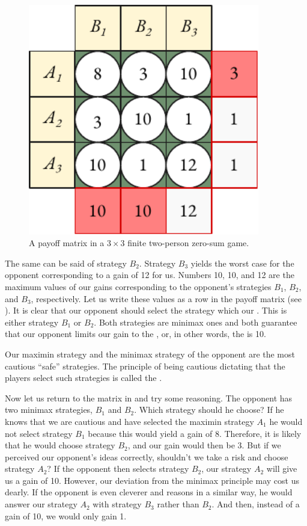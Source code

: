  \begin{figure}%
 \centering
 \includegraphics[width=0.9\textwidth]{figures/two-player3.pdf}
\caption{A payoff matrix in a $3 \times 3$ finite two-person zero-sum game.\label{twoplayer3}}
 \end{figure}
The same can be said of strategy $B_{2}$. Strategy $B_{3}$ yields the worst case
for the opponent corresponding to a gain of 12 for us. Numbers 10, 10,
and 12 are the maximum values of our gains corresponding to the
opponent's strategies $B_{1}$, $B_{2}$, and $B_{3}$, respectively. Let us write these values as a row in the payoff matrix (see ). It is clear that our opponent should select the strategy which  our . This is either strategy $B_{1}$ or $B_{2}$. Both strategies are minimax ones and both guarantee that our opponent limits our gain to the , or, in other words, the  is 10.

Our maximin strategy and the minimax strategy of the opponent are
the most cautious ``safe'' strategies. The principle of being cautious
dictating that the players select such strategies is called the .

Now let us return to the matrix in  and try some reasoning. The opponent has two minimax strategies,  $B_{1}$ and  $B_{2}$. Which strategy should he choose? If he knows that we are cautious and have selected the maximin strategy  $A_{1}$ he would not select strategy  $B_{1}$ because this would yield a gain of 8. Therefore, it is likely that he would choose
strategy $B_{2}$, and our gain would then be 3. But if we perceived our
opponent's ideas correctly, shouldn't we take a risk and choose strategy
 $A_{2}$? If the opponent then selects strategy  $B_{2}$, our strategy  $A_{2}$ will give us a gain of 10. However, our deviation from the minimax principle may
cost us dearly. If the opponent is even cleverer and reasons in a similar
way, he would answer our strategy  $A_{2}$ with strategy  $B_{3}$ rather than  $B_{2}$. And then, instead of a gain of 10, we would only gain 1.

